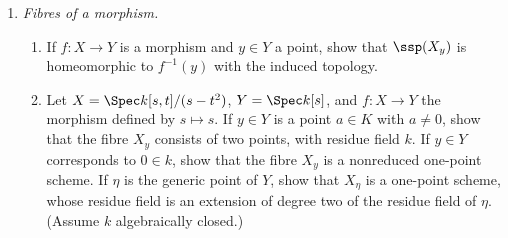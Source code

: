\documentclass[12pt]{amsart}
\begin{document}
% 

\begin{enumerate}
	\item[3.10.] {
      \emph{Fibres of a morphism.}
      \begin{enumerate}
        \item If $f:X\to Y$ is a morphism and $y\in Y$ a point, show that $\ssp(X_y)$ is homeomorphic to $f^{-1}(y)$ with the induced topology.
        \item Let $X=\Spec k[s,t]/(s-t^2)$, $Y=\Spec k[s]$, and $f:X\to Y$ the morphism defined by $s\mapsto s$.
          If $y\in Y$ is a point $a\in K$ with $a\neq 0$, show that the fibre $X_y$ consists of two points, with residue field $k$.
          If $y\in Y$ corresponds to $0\in k$, show that the fibre $X_y$ is a nonreduced one-point scheme.
          If $\eta$ is the generic point of $Y$, show that $X_\eta$ is a one-point scheme, whose residue field is an extension of degree two of the residue field of $\eta$. (Assume $k$ algebraically closed.)
      \end{enumerate}
    }
\end{enumerate}
\end{document}
